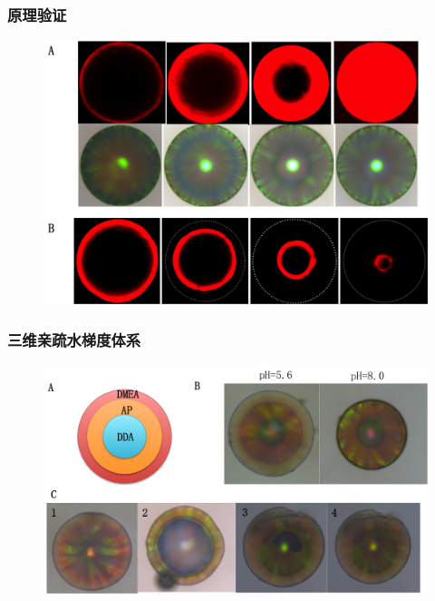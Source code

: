 \documentclass{beamer}
\begin{document}
\begin{frame}
  \frametitle{原理验证}
  \begin{figure}
    \begin{center}
      \includegraphics[width=0.8\linewidth]{figures/ch3/Figure2.png}
    \end{center}
  \end{figure}
\end{frame}


\begin{frame}
  \frametitle{三维亲疏水梯度体系}
  \begin{figure}
    \begin{center}
      \includegraphics[width=0.9\linewidth]{figures/ch3/Figure3.png}
    \end{center}
  \end{figure}
\end{frame}
\end{document}
